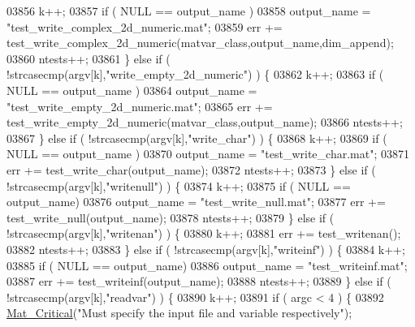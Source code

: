\begin{DoxyCode}
{{{{{{{{{{{{{{{{{{{{{{{{{{{{{{{{{{{{{{{{{{{{{{{{{{{{{{{{{{{{{{{{{{{{03856             k++;
03857             \textcolor{keywordflow}{if} ( NULL == output\_name )
03858                 output\_name = \textcolor{stringliteral}{"test\_write\_complex\_2d\_numeric.mat"};
03859             err += test\_write\_complex\_2d\_numeric(matvar\_class,output\_name,dim\_append);
03860             ntests++;
03861         \} \textcolor{keywordflow}{else} \textcolor{keywordflow}{if} ( !strcasecmp(argv[k],\textcolor{stringliteral}{"write\_empty\_2d\_numeric"}) ) \{
03862             k++;
03863             \textcolor{keywordflow}{if} ( NULL == output\_name )
03864                 output\_name = \textcolor{stringliteral}{"test\_write\_empty\_2d\_numeric.mat"};
03865             err += test\_write\_empty\_2d\_numeric(matvar\_class,output\_name);
03866             ntests++;
03867         \} \textcolor{keywordflow}{else} \textcolor{keywordflow}{if} ( !strcasecmp(argv[k],\textcolor{stringliteral}{"write\_char"}) ) \{
03868             k++;
03869             \textcolor{keywordflow}{if} ( NULL == output\_name )
03870                 output\_name = \textcolor{stringliteral}{"test\_write\_char.mat"};
03871             err += test\_write\_char(output\_name);
03872             ntests++;
03873         \} \textcolor{keywordflow}{else} \textcolor{keywordflow}{if} ( !strcasecmp(argv[k],\textcolor{stringliteral}{"writenull"}) ) \{
03874             k++;
03875             \textcolor{keywordflow}{if} ( NULL == output\_name)
03876                 output\_name = \textcolor{stringliteral}{"test\_write\_null.mat"};
03877             err += test\_write\_null(output\_name);
03878             ntests++;
03879         \} \textcolor{keywordflow}{else} \textcolor{keywordflow}{if} ( !strcasecmp(argv[k],\textcolor{stringliteral}{"writenan"}) ) \{
03880             k++;
03881             err += test\_writenan();
03882             ntests++;
03883         \} \textcolor{keywordflow}{else} \textcolor{keywordflow}{if} ( !strcasecmp(argv[k],\textcolor{stringliteral}{"writeinf"}) ) \{
03884             k++;
03885             \textcolor{keywordflow}{if} ( NULL == output\_name)
03886                 output\_name = \textcolor{stringliteral}{"test\_writeinf.mat"};
03887             err += test\_writeinf(output\_name);
03888             ntests++;
03889         \} \textcolor{keywordflow}{else} \textcolor{keywordflow}{if} ( !strcasecmp(argv[k],\textcolor{stringliteral}{"readvar"}) ) \{
03890             k++;
03891             \textcolor{keywordflow}{if} ( argc < 4 ) \{
03892                 \hyperlink{group__mat__util_gaf51f2bfbb5580f575e4dd79757e2b80c}{Mat\_Critical}(\textcolor{stringliteral}{"Must specify the input file and variable respectively"});
}}}}}}}}}}}}}}}}}}}}}}}}}}}}}}}}}}}}}}}}}}}}}}}}}}}}}}}}}}}}}}}}}}}}
\end{DoxyCode}
